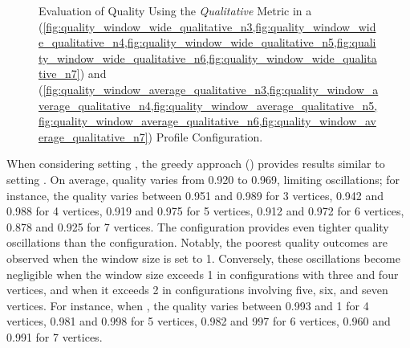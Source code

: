 \begin{figure}[H]
\begin{adjustbox}{minipage=\linewidth,scale=0.75}
\begin{subfigure}{0.45\textwidth}
      \end{subfigure}

    \caption{Evaluation of Quality Using the \emph{Qualitative} Metric in a \wide (\cref{fig:quality_window_wide_qualitative_n3,fig:quality_window_wide_qualitative_n4,fig:quality_window_wide_qualitative_n5,fig:quality_window_wide_qualitative_n6,fig:quality_window_wide_qualitative_n7}) and \average (\cref{fig:quality_window_average_qualitative_n3,fig:quality_window_average_qualitative_n4,fig:quality_window_average_qualitative_n5,fig:quality_window_average_qualitative_n6,fig:quality_window_average_qualitative_n7}) Profile Configuration.}  \label{fig:quality_window_qualitative}
  \end{adjustbox}
  \end{figure}

  When considering setting \average, the greedy approach () provides results similar to setting \wide. On average, quality varies from 0.920 to 0.969, limiting oscillations; for instance, the quality varies between 0.951 and 0.989 for 3 vertices, 0.942 and 0.988 for 4 vertices, 0.919 and 0.975 for 5 vertices, 0.912 and 0.972 for 6 vertices, 0.878 and 0.925 for 7 vertices. The \average configuration provides even tighter quality oscillations than the \wide configuration. Notably, the poorest quality outcomes are observed when the window size is set to 1. Conversely, these oscillations become negligible when the window size exceeds 1 in configurations with three and four vertices, and when it exceeds 2 in configurations involving five, six, and seven vertices.  For instance, when , the quality varies between  0.993 and 1 for 4 vertices, 0.981 and 0.998 for 5 vertices, 0.982 and 997 for 6 vertices, 0.960 and 0.991 for 7 vertices.

